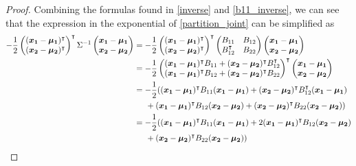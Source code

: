 \documentclass[12pt]{article}
\theoremstyle{definition}
\newcommand{\vect}[1]{\boldsymbol{#1}}
\begin{document}
\begin{proof}
   Combining the formulas found in \eqref{inverse} and \eqref{b11_inverse}, we can
   see that the expression in the exponential of \eqref{partition_joint} can be simplified as
   \begin{align}\label{exponential}
     -\frac{1}{2}\begin{pmatrix} (\vect{x_1} - \vect{\mu_1})^\intercal \\ (\vect{x_2} - \vect{\mu_2})^\intercal \end{pmatrix}^\intercal \Sigma ^{-1} \begin{pmatrix}\vect{x_1} - \vect{\mu_1} \\ \vect{x_2} - \vect{\mu_2} \end{pmatrix}
     &= -\frac{1}{2}\begin{pmatrix} (\vect{x_1} - \vect{\mu_1})^\intercal \\ (\vect{x_2} - \vect{\mu_2})^\intercal \end{pmatrix}^\intercal \begin{pmatrix} B_{11} & B_{12} \\ B_{12}^\intercal & B_{22} \end{pmatrix} \begin{pmatrix}\vect{x_1} - \vect{\mu_1} \\ \vect{x_2} - \vect{\mu_2} \end{pmatrix} \notag \\
     &= -\frac{1}{2} \begin{pmatrix} (\vect{x_1} - \vect{\mu_1})^\intercal B_{11} + (\vect{x_2} - \vect{\mu_2})^\intercal B_{12}^\intercal \\ (\vect{x_1} - \vect{\mu_1})^\intercal B_{12} + (\vect{x_2} - \vect{\mu_2})^\intercal B_{22} \end{pmatrix} ^ \intercal \begin{pmatrix}\vect{x_1} - \vect{\mu_1} \\ \vect{x_2} - \vect{\mu_2} \end{pmatrix} \notag \\
     &= -\frac{1}{2} ( (\vect{x_1} - \vect{\mu_1})^\intercal B_{11} (\vect{x_1} - \vect{\mu_1}) + (\vect{x_2} - \vect{\mu_2})^\intercal B_{12}^\intercal (\vect{x_1} - \vect{\mu_1}) \notag \\ & \hspace{5mm} + (\vect{x_1} - \vect{\mu_1})^\intercal B_{12} (\vect{x_2} - \vect{\mu_2}) + (\vect{x_2} - \vect{\mu_2})^\intercal B_{22} (\vect{x_2} - \vect{\mu_2}) )  \notag \\
     &= -\frac{1}{2} ( (\vect{x_1} - \vect{\mu_1})^\intercal B_{11} (\vect{x_1} - \vect{\mu_1}) + 2(\vect{x_1} - \vect{\mu_1})^\intercal B_{12} (\vect{x_2} - \vect{\mu_2})  \notag \\ & \hspace{5mm} + (\vect{x_2} - \vect{\mu_2})^\intercal B_{22} (\vect{x_2} - \vect{\mu_2}) ) \notag \\

\end{align}
\end{proof}
\end{document}
